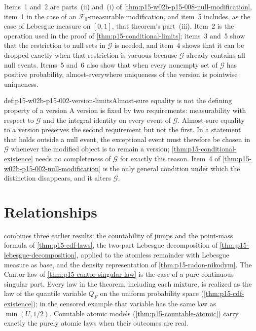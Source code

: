 Items~1 and~2 are parts~(ii) and~(i) of
\cref{thm:p15-w02b-p15-008-null-modification}, item~1 in the case of an
\(\mathcal F_0\)-measurable modification, and item~5 includes, as the case
of Lebesgue measure on \([0,1]\), that theorem's part~(iii). Item~2 is the
operation used in the proof of \cref{thm:p15-conditional-limits}; items~3 and~5 show that the
restriction to null sets in \(\mathcal G\) is needed, and item~4 shows
that it can be dropped exactly when that restriction is vacuous because
\(\mathcal G\) already contains all null events. Items~5 and~6 also show
that when every nonempty set of \(\mathcal G\) has positive probability,
almost-everywhere uniqueness of the version is pointwise uniqueness.

\begin{hbwarning}{def:p15-w02b-p15-002-version-limits}{Almost-sure equality is not the defining property of a version}
A version is fixed by two requirements: measurability with respect to
\(\mathcal G\) and the integral identity on every event of \(\mathcal G\).
Almost-sure equality to a version preserves the second requirement but not
the first. In a statement that holds outside a null event, the exceptional
event must therefore be chosen in \(\mathcal G\) whenever the modified
object is to remain a version; \cref{thm:p15-conditional-existence} needs
no completeness of \(\mathcal G\) for exactly this reason. Item~4 of
\cref{thm:p15-w02b-p15-002-null-modification} is the only general
condition under which the distinction disappears, and it alters
\(\mathcal G\).
\end{hbwarning}

\section{Relationships}
\label{sec:p15-w02b-p15-002-relationships}

 combines three earlier results:
the countability of jumps and the point-mass formula of
\cref{thm:p15-cdf-laws}, the two-part Lebesgue decomposition of
\cref{thm:p15-lebesgue-decomposition}, applied to the atomless remainder
with Lebesgue measure as base, and the density representation of
\cref{thm:p15-radon-nikodym}. The Cantor law of
\cref{thm:p15-cantor-singular-law} is the case of a pure continuous
singular part. Every law in the theorem, including each mixture, is
realized as the law of the quantile variable \(Q_F\) on the uniform
probability space (\cref{thm:p15-cdf-existence}); in the censored example
that variable has the same law as \(\min(U,1/2)\). Countable atomic models
(\cref{thm:p15-countable-atomic}) carry exactly the purely atomic laws
when their outcomes are real.


